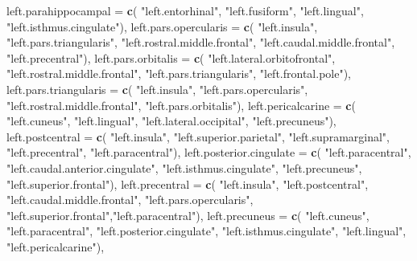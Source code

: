 \documentclass[
]{article}
\newenvironment{Shaded}{\begin{snugshade}}{\end{snugshade}}
\newcommand{\DataTypeTok}[1]{\textcolor[rgb]{0.13,0.29,0.53}{#1}}
\newcommand{\KeywordTok}[1]{\textcolor[rgb]{0.13,0.29,0.53}{\textbf{#1}}}
\newcommand{\NormalTok}[1]{#1}
\newcommand{\StringTok}[1]{\textcolor[rgb]{0.31,0.60,0.02}{#1}}
\begin{document}
\begin{Shaded}
\begin{Highlighting}[]
 \DataTypeTok{left.parahippocampal =} \KeywordTok{c}\NormalTok{(}
   \StringTok{"left.entorhinal"}\NormalTok{, }\StringTok{"left.fusiform"}\NormalTok{,  }\StringTok{"left.lingual"}\NormalTok{,}
   \StringTok{"left.isthmus.cingulate"}\NormalTok{),}
 \DataTypeTok{left.pars.opercularis =} \KeywordTok{c}\NormalTok{(}
   \StringTok{"left.insula"}\NormalTok{, }\StringTok{"left.pars.triangularis"}\NormalTok{, }\StringTok{"left.rostral.middle.frontal"}\NormalTok{,}
   \StringTok{"left.caudal.middle.frontal"}\NormalTok{, }\StringTok{"left.precentral"}\NormalTok{),}
 \DataTypeTok{left.pars.orbitalis =} \KeywordTok{c}\NormalTok{(}
   \StringTok{"left.lateral.orbitofrontal"}\NormalTok{, }\StringTok{"left.rostral.middle.frontal"}\NormalTok{,}
   \StringTok{"left.pars.triangularis"}\NormalTok{, }\StringTok{"left.frontal.pole"}\NormalTok{),}
 \DataTypeTok{left.pars.triangularis =} \KeywordTok{c}\NormalTok{(}
   \StringTok{"left.insula"}\NormalTok{, }\StringTok{"left.pars.opercularis"}\NormalTok{, }\StringTok{"left.rostral.middle.frontal"}\NormalTok{,}
   \StringTok{"left.pars.orbitalis"}\NormalTok{),}
 \DataTypeTok{left.pericalcarine =} \KeywordTok{c}\NormalTok{(}
   \StringTok{"left.cuneus"}\NormalTok{, }\StringTok{"left.lingual"}\NormalTok{, }\StringTok{"left.lateral.occipital"}\NormalTok{, }\StringTok{"left.precuneus"}\NormalTok{),}
 \DataTypeTok{left.postcentral =} \KeywordTok{c}\NormalTok{(}
   \StringTok{"left.insula"}\NormalTok{, }\StringTok{"left.superior.parietal"}\NormalTok{, }\StringTok{"left.supramarginal"}\NormalTok{,}
   \StringTok{"left.precentral"}\NormalTok{, }\StringTok{"left.paracentral"}\NormalTok{),}
 \DataTypeTok{left.posterior.cingulate =} \KeywordTok{c}\NormalTok{(}
   \StringTok{"left.paracentral"}\NormalTok{, }\StringTok{"left.caudal.anterior.cingulate"}\NormalTok{, }\StringTok{"left.isthmus.cingulate"}\NormalTok{,}
   \StringTok{"left.precuneus"}\NormalTok{, }\StringTok{"left.superior.frontal"}\NormalTok{),}
 \DataTypeTok{left.precentral =} \KeywordTok{c}\NormalTok{(}
   \StringTok{"left.insula"}\NormalTok{, }\StringTok{"left.postcentral"}\NormalTok{, }\StringTok{"left.caudal.middle.frontal"}\NormalTok{,}
   \StringTok{"left.pars.opercularis"}\NormalTok{, }\StringTok{"left.superior.frontal"}\NormalTok{,}\StringTok{"left.paracentral"}\NormalTok{),}
 \DataTypeTok{left.precuneus =} \KeywordTok{c}\NormalTok{(}
   \StringTok{"left.cuneus"}\NormalTok{, }\StringTok{"left.paracentral"}\NormalTok{, }\StringTok{"left.posterior.cingulate"}\NormalTok{,}
   \StringTok{"left.isthmus.cingulate"}\NormalTok{, }\StringTok{"left.lingual"}\NormalTok{, }\StringTok{"left.pericalcarine"}\NormalTok{),}

\end{Highlighting}
\end{Shaded}
\end{document}
